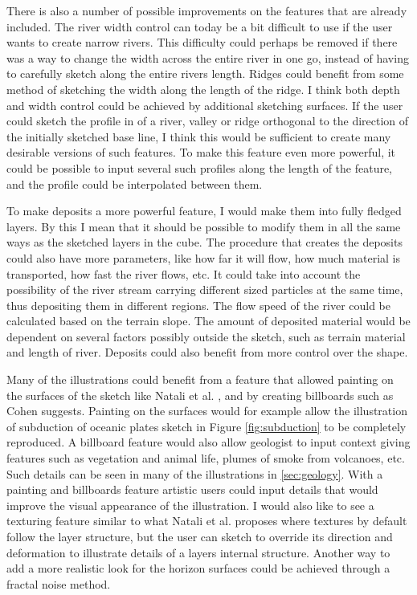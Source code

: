 \documentclass[a4paper,12pt]{report}
\newcommand{\secref}[1]{\autoref{#1}}
\begin{document}
There is also a number of possible improvements on the features that are already included. The river width control can today be a bit difficult to use if the user wants to create narrow rivers. This difficulty could perhaps be removed if there was a way to change the width across the entire river in one go, instead of having to carefully sketch along the entire rivers length. Ridges could benefit from some method of sketching the width along the length of the ridge. I think both depth and width control could be achieved by additional sketching surfaces. If the user could sketch the profile in of a river, valley or ridge orthogonal to the direction of the initially sketched base line, I think this would be sufficient to create many desirable versions of such features. To make this feature even more powerful, it could be possible to input several such profiles along the length of the feature, and the profile could be interpolated between them.

To make deposits a more powerful feature, I would make them into fully fledged layers. By this I mean that it should be possible to modify them in all the same ways as the sketched layers in the cube. The procedure that creates the deposits could also have more parameters, like how far it will flow, how much material is transported, how fast the river flows, etc. It could take into account the possibility of the river stream carrying different sized particles at the same time, thus depositing them in different regions. The flow speed of the river could be calculated based on the terrain slope. The amount of deposited material would be dependent on several factors possibly outside the sketch, such as terrain material and length of river. Deposits could also benefit from more control over the shape.

Many of the illustrations could benefit from a feature that allowed painting on the surfaces of the sketch like Natali et al. \cite{natalirapid}, and by creating billboards such as Cohen \cite{cohen2000harold} suggests. Painting on the surfaces would for example allow the illustration of subduction of oceanic plates sketch in Figure \ref{fig:subduction} to be completely reproduced. A billboard feature would also allow geologist to input context giving features such as vegetation and animal life, plumes of smoke from volcanoes, etc. Such details can be seen in many of the illustrations in \secref{sec:geology}. With a painting and billboards feature artistic users could input details that would improve the visual appearance of the illustration. I would also like to see a texturing feature similar to what Natali et al. proposes where textures by default follow the layer structure, but the user can sketch to override its direction and deformation to illustrate details of a layers internal structure. Another way 
to add a more realistic look for the horizon surfaces could be achieved through a fractal noise method.
\end{document}
